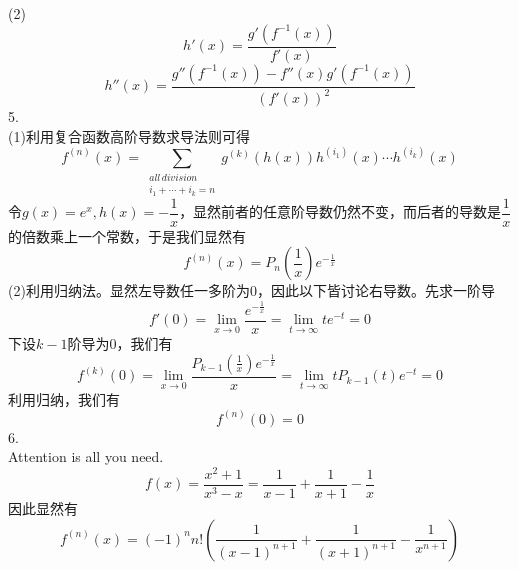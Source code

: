 \documentclass[utf8]{ctexart}
\begin{document}
(2)
\[h'(x)=\frac{g'(f^{-1}(x))}{f'(x)}\]
\[h''(x)=\frac{g''(f^{-1}(x))-f''(x)g'(f^{-1}(x))}{(f'(x))^2}\]
5.\\
(1)利用复合函数高阶导数求导法则可得
\[f^{(n)}(x)=\sum_{\substack{all\,division\\i_1+\cdots+i_k=n}}g^{(k)}(h(x))h^{(i_1)}(x)\cdots h^{(i_k)}(x)\]
令$g(x)=e^x,h(x)=-\dfrac{1}{x}$，显然前者的任意阶导数仍然不变，而后者的导数是$\dfrac{1}{x}$的倍数乘上一个常数，于是我们显然有
\[f^{(n)}(x)=P_n(\frac{1}{x})e^{-\frac{1}{x}}\]
(2)利用归纳法。显然左导数任一多阶为$0$，因此以下皆讨论右导数。先求一阶导
\[f'(0)=\lim\limits_{x\rightarrow0}\frac{e^{-\frac{1}{x}}}{x}=\lim\limits_{t\rightarrow\infty}te^{-t}=0\]
下设$k-1$阶导为$0$，我们有
\[f^{(k)}(0)=\lim\limits_{x\rightarrow0}\frac{P_{k-1}(\frac{1}{x})e^{-\frac{1}{x}}}{x}=\lim\limits_{t\rightarrow\infty}tP_{k-1}(t)e^{-t}=0\]
利用归纳，我们有
\[f^{(n)}(0)=0\]
6.\\
Attention is all you need.
\[f(x)=\frac{x^2+1}{x^3-x}=\frac{1}{x-1}+\frac{1}{x+1}-\frac{1}{x}\]
因此显然有
\[f^{(n)}(x)=(-1)^nn!(\frac{1}{(x-1)^{n+1}}+\frac{1}{(x+1)^{n+1}}-\frac{1}{x^{n+1}})\]
\end{document}
